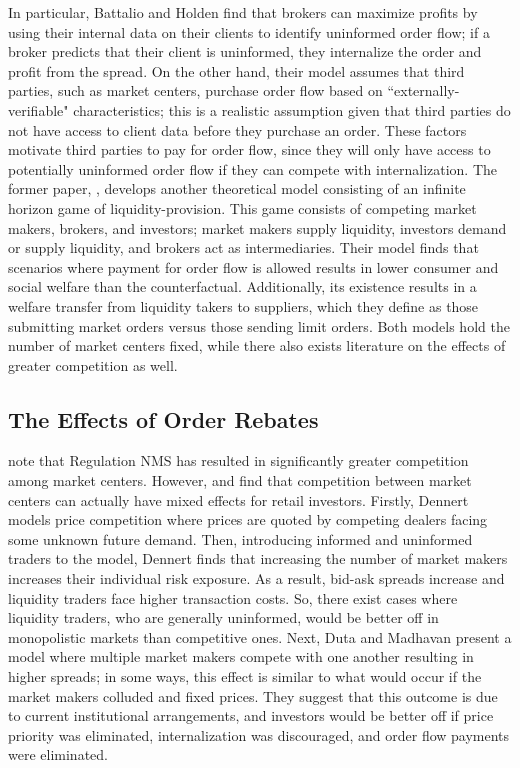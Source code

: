 \documentclass[12pt,a4paper]{extarticle}
\begin{document}
In particular, Battalio and Holden find that brokers can maximize profits by using their internal data on their clients to identify uninformed order flow; if a broker predicts that their client is uninformed, they internalize the order and profit from the spread. On the other hand, their model assumes that third parties, such as market centers, purchase order flow based on ``externally-verifiable" characteristics; this is a realistic assumption given that third parties do not have access to client data before they purchase an order. These factors motivate third parties to pay for order flow, since they will only have access to potentially uninformed order flow if they can compete with internalization. The former paper, \citet{parlour}, develops another theoretical model consisting of an infinite horizon game of liquidity-provision. This game consists of competing market makers, brokers, and investors; market makers supply liquidity, investors demand or supply liquidity, and brokers act as intermediaries. Their model finds that scenarios where payment for order flow is allowed results in lower consumer and social welfare than the counterfactual. Additionally, its existence results in a welfare transfer from liquidity takers to suppliers, which they define as those submitting market orders versus those sending limit orders. Both models hold the number of market centers fixed, while there also exists literature on the effects of greater competition as well. 

\subsection{The Effects of Order Rebates}

\citet{Angel} note that Regulation NMS has resulted in significantly greater competition among market centers. However, \citet{Dennert} and \citet{Dutta} find that competition between market centers can actually have mixed effects for retail investors. Firstly, Dennert models price competition where prices are quoted by competing dealers facing some unknown future demand. Then, introducing informed and uninformed traders to the model, Dennert finds that increasing the number of market makers increases their individual risk exposure. As a result, bid-ask spreads increase and liquidity traders face higher transaction costs. So, there exist cases where liquidity traders, who are generally uninformed, would be better off in monopolistic markets than competitive ones. Next, Duta and Madhavan present a model where multiple market makers compete with one another resulting in higher spreads; in some ways, this effect is similar to what would occur if the market makers colluded and fixed prices. They suggest that this outcome is due to current institutional arrangements, and investors would be better off if price priority was eliminated, internalization was discouraged, and order flow payments were eliminated. 
\end{document}
